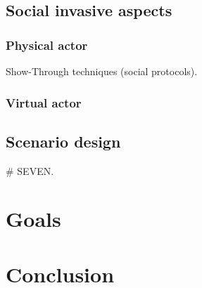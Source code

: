 \documentclass[a4paper]{article}
\begin{document}
\subsection{Social invasive aspects}

\subsubsection{Physical actor}
Show-Through techniques (social protocols).

\subsubsection{Virtual actor}

\subsection{Scenario design}
\# SEVEN.

\section{Goals}

\section{Conclusion}
\end{document}
